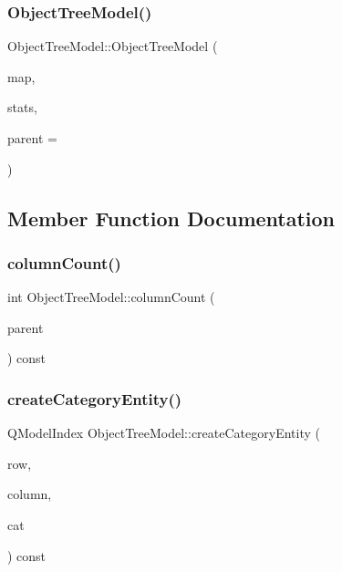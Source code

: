 \subsubsection{\texorpdfstring{ObjectTreeModel()}{ObjectTreeModel()}}
{\footnotesize\ttfamily Object\+Tree\+Model\+::\+Object\+Tree\+Model (\begin{DoxyParamCaption}\item[{\mbox{\hyperlink{class_map_objects_controller}{Map\+Objects\+Controller}} $\ast$}]{map,  }\item[{\mbox{\hyperlink{class_stats_controller}{Stats\+Controller}} $\ast$}]{stats,  }\item[{Q\+Object $\ast$}]{parent = {} }\end{DoxyParamCaption})\hspace{0.3cm}{\ttfamily [explicit]}}



\subsection{Member Function Documentation}
\mbox{\label{class_object_tree_model_a05b2e971aab7fd39c9b10d71b1e43367}} 
\subsubsection{\texorpdfstring{columnCount()}{columnCount()}}
{\footnotesize\ttfamily int Object\+Tree\+Model\+::column\+Count (\begin{DoxyParamCaption}\item[{const Q\+Model\+Index \&}]{parent }\end{DoxyParamCaption}) const}

\mbox{\label{class_object_tree_model_a1b013daa9bc6995e189e14a74ca4a0c6}} 
\subsubsection{\texorpdfstring{createCategoryEntity()}{createCategoryEntity()}}
{\footnotesize\ttfamily Q\+Model\+Index Object\+Tree\+Model\+::create\+Category\+Entity (\begin{DoxyParamCaption}\item[{int}]{row,  }\item[{int}]{column,  }\item[{\mbox{\hyperlink{class_object_tree_model_a379e9d6b0d381853785adf62095ba4e3}{Category}}}]{cat }\end{DoxyParamCaption}) const}

